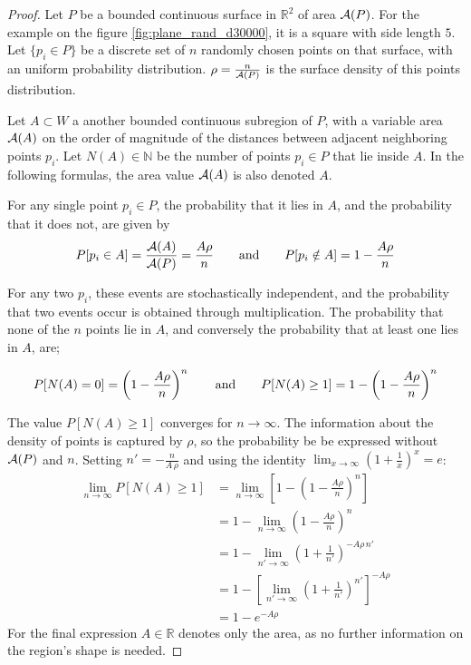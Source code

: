 \begin{proof}
Let $P$ be a bounded continuous surface in $\mathbb{R}^2$ of area $\mathcal{A}(P)$. For the example on the figure \ref{fig:plane_rand_d30000}, it is a square with side length $5$. Let $\{ p_i \in P \}$ be a discrete set of $n$ randomly chosen points on that surface, with an uniform probability distribution. $\rho = \frac{n}{\mathcal{A}(P)}$ is the surface density of this points distribution.

Let $A \subset W$ a another bounded continuous subregion of $P$, with a variable area $\mathcal{A}(A)$ on the order of magnitude of the distances between adjacent neighboring points $p_i$. Let $N(A) \in \mathbb{N}$ be the number of points $p_i \in P$ that lie inside $A$. In the following formulas, the area value $\mathcal{A}(A)$ is also denoted $A$.

For any single point $p_i \in P$, the probability that it lies in $A$, and the probability that it does not, are given by
\begin{equation} \label{eq:rand_point_in_A}
P[p_i \in A] = \frac{\mathcal{A}(A)}{\mathcal{A}(P)} = \frac{A \rho}{n}
\hspace{7mm} \text{and} \hspace{7mm}
P[p_i \notin A] = 1 - \frac{A \rho}{n}
\end{equation}

For any two $p_i$, these events are stochastically independent, and the probability that two events occur is obtained through multiplication. The probability that none of the $n$ points lie in $A$, and conversely the probability that at least one lies in $A$, are;

\begin{equation}
P[N(A) = 0] = \left(1 - \frac{A \rho}{n}\right)^n
\hspace{7mm} \text{and} \hspace{7mm}
P[N(A) \geq 1] = 1 - \left(1 - \frac{A \rho}{n}\right)^n
\end{equation}


The value $P[N(A) \geq 1]$ converges for $n \rightarrow \infty$. The information about the density of points is captured by $\rho$, so the probability be be expressed without $\mathcal{A}(P)$ and $n$. Setting $n' = -\frac{n}{A \, \rho}$ and using the identity $\lim_{x \rightarrow \infty} \left( 1 + \frac{1}{x} \right)^x = e$:
\begin{equation}
\begin{align}
\lim_{n \rightarrow \infty} P[N(A) \geq 1]
& = \lim_{n \rightarrow \infty} \left[ 1 - \left(1 - \frac{A \rho}{n}\right)^n \right]\\
& = 1 - \lim_{n \rightarrow \infty} \left(1 - \frac{A \rho}{n}\right)^n \\
& = 1 - \lim_{n' \rightarrow \infty} \left(1 + \frac{1}{n'}\right)^{-A \rho \, n'}\\
& = 1 - \left[ \lim_{n' \rightarrow \infty} \left(1 + \frac{1}{n'}\right)^{n'} \right]^{-A \rho}\\
& = 1 - e^{-A \rho}
\end{align}
\label{eq:leastone_point_prob}
\end{equation}
For the final expression $A \in \mathbb{R}$ denotes only the area, as no further information on the region's shape is needed. 


\end{proof}
